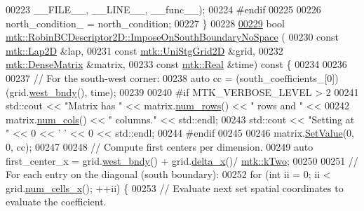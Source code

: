 \begin{DoxyCode}
00223                       \_\_FILE\_\_, \_\_LINE\_\_, \_\_func\_\_);
00224 \textcolor{preprocessor}{  #endif}
00225 
00226   north\_condition\_ = north\_condition;
00227 \}
00228 
\hypertarget{mtk__robin__bc__descriptor__2d_8cc_source_l00229}{}\hyperlink{classmtk_1_1RobinBCDescriptor2D_a82159bcca93555114532c5fa4d0fb3db}{00229} \textcolor{keywordtype}{bool} \hyperlink{classmtk_1_1RobinBCDescriptor2D_a82159bcca93555114532c5fa4d0fb3db}{mtk::RobinBCDescriptor2D::ImposeOnSouthBoundaryNoSpace}
      (
00230     \textcolor{keyword}{const} \hyperlink{classmtk_1_1Lap2D}{mtk::Lap2D} &lap,
00231     \textcolor{keyword}{const} \hyperlink{classmtk_1_1UniStgGrid2D}{mtk::UniStgGrid2D} &grid,
00232     \hyperlink{classmtk_1_1DenseMatrix}{mtk::DenseMatrix} &matrix,
00233     \textcolor{keyword}{const} \hyperlink{group__c01-roots_gac080bbbf5cbb5502c9f00405f894857d}{mtk::Real} &time)\textcolor{keyword}{ const }\{
00234 
00236 
00237   \textcolor{comment}{// For the south-west corner:}
00238   \textcolor{keyword}{auto} cc = (south\_coefficients\_[0])(grid.\hyperlink{classmtk_1_1UniStgGrid2D_af2b1712387ded85edaf2b64617d3fc13}{west\_bndy}(), time);
00239 
00240 \textcolor{preprocessor}{  #if MTK\_VERBOSE\_LEVEL > 2}
00241   std::cout << \textcolor{stringliteral}{"Matrix has "} << matrix.\hyperlink{classmtk_1_1DenseMatrix_a53f3afb3b6a8d21854458aaa9663cc74}{num\_rows}() << \textcolor{stringliteral}{" rows and "} <<
00242     matrix.\hyperlink{classmtk_1_1DenseMatrix_a41747502d468c6728a4be31501b16e0e}{num\_cols}() << \textcolor{stringliteral}{" columns."} << std::endl;
00243   std::cout << \textcolor{stringliteral}{"Setting at "} << 0 << \textcolor{charliteral}{' '} << 0 << std::endl;
00244 \textcolor{preprocessor}{  #endif}
00245 
00246   matrix.\hyperlink{classmtk_1_1DenseMatrix_a784ce5784109ac86bfb9d8562b334b13}{SetValue}(0, 0, cc);
00247 
00248   \textcolor{comment}{// Compute first centers per dimension.}
00249   \textcolor{keyword}{auto} first\_center\_x = grid.\hyperlink{classmtk_1_1UniStgGrid2D_af2b1712387ded85edaf2b64617d3fc13}{west\_bndy}() + grid.\hyperlink{classmtk_1_1UniStgGrid2D_aca4710004c4a7da6a9e8fd6ab32a691f}{delta\_x}()/
      \hyperlink{group__c01-roots_gaf39c2d851a2db744f4feb1c5ab3ec2cf}{mtk::kTwo};
00250 
00251   \textcolor{comment}{// For each entry on the diagonal (south boundary):}
00252   \textcolor{keywordflow}{for} (\textcolor{keywordtype}{int} ii = 0; ii < grid.\hyperlink{classmtk_1_1UniStgGrid2D_a2d182866a398aba8e4829590e85bf939}{num\_cells\_x}(); ++ii) \{
00253     \textcolor{comment}{// Evaluate next set spatial coordinates to evaluate the coefficient.}

\end{DoxyCode}
